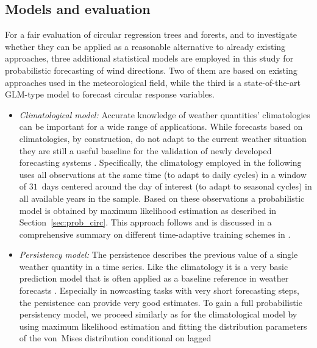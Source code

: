 \documentclass[nojss,shortnames]{jss}
\numberwithin{equation}{section}
\begin{document}
\subsection{Models and evaluation}
\label{sec:wind:models}
For a fair evaluation of circular regression trees and forests, and to
investigate whether they can be applied as a reasonable alternative to already
existing approaches, three additional statistical models are employed in this
study for probabilistic forecasting of wind directions. Two of them are based
on existing approaches used in the meteorological field, while the third is a
state-of-the-art GLM-type model to forecast circular response variables.

\begin{itemize}
  \item \emph{Climatological model:} 
    Accurate knowledge of weather quantities' climatologies can be important for a
    wide range of applications. While forecasts based on climatologies, by
    construction, do not adapt to the current weather situation they are still a
    useful baseline for the validation of newly developed forecasting systems
    \citep{Simon+Umlauf+Zeileis:2017, Stauffer+Mayr+Messner:2017}. 
    \newline
    Specifically, the climatology employed in the following uses all observations
    at the same time (to adapt to daily cycles) in a window of $31$~days centered
    around the day of interest (to adapt to seasonal cycles)
    in all available years in the sample. Based on these observations a probabilistic
    model is obtained by maximum likelihood estimation as described in
    Section~\ref{sec:prob_circ}. This approach follows \citet{Vogel+Knippertz+Fink:2018}
    and is discussed in a comprehensive summary on different time-adaptive training schemes in
    \citet{Lang+Lerch+Mayr:2019}.
  \item \emph{Persistency model:}
    The persistence describes the previous value of a single weather quantity
    in a time series. Like the climatology it is a very basic prediction model that
    is often applied as a baseline reference in weather forecasts
    \citep{noaasnationalweatherservice:2019}. Especially in nowcasting tasks with very short
    forecasting steps, the persistence can provide very good estimates.
    \newline
    To gain a full probabilistic persistency model, we proceed similarly as for
    the climatological model by using maximum likelihood estimation and fitting the
    distribution parameters of the von~Mises distribution conditional on lagged

\end{itemize}
\end{document}
